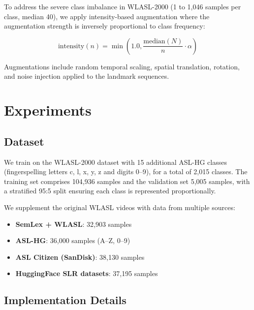 \documentclass[conference]{IEEEtran}
\begin{document}
To address the severe class imbalance in WLASL-2000 (1 to 1,046 samples per class, median 40), we apply intensity-based augmentation where the augmentation strength is inversely proportional to class frequency:

\begin{equation}
\text{intensity}(n) = \min\left(1.0, \frac{\text{median}(N)}{n} \cdot \alpha\right)
\end{equation}

Augmentations include random temporal scaling, spatial translation, rotation, and noise injection applied to the landmark sequences.

\section{Experiments}

\subsection{Dataset}

We train on the WLASL-2000 dataset with 15 additional ASL-HG classes (fingerspelling letters c, l, x, y, z and digits 0--9), for a total of 2,015 classes. The training set comprises 104,936 samples and the validation set 5,005 samples, with a stratified 95:5 split ensuring each class is represented proportionally.

We supplement the original WLASL videos with data from multiple sources:
\begin{itemize}
    \item \textbf{SemLex + WLASL}: 32,903 samples
    \item \textbf{ASL-HG}: 36,000 samples (A--Z, 0--9)
    \item \textbf{ASL Citizen (SanDisk)}: 38,130 samples
    \item \textbf{HuggingFace SLR datasets}: 37,195 samples
\end{itemize}

\subsection{Implementation Details}
\end{document}

